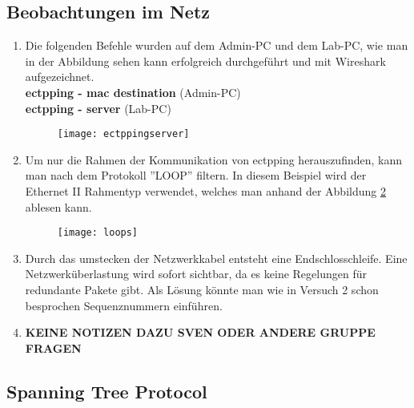 \documentclass{scrartcl}
\begin{document}
  \subsection[Aufgabe 4 Beobachtungen im Netz]{Beobachtungen im Netz}
  
  \renewcommand{\labelenumi}{\alph{enumi})}
  \begin{enumerate}
  \item
  Die folgenden Befehle wurden auf dem Admin-PC und dem Lab-PC, wie man in der Abbildung sehen kann erfolgreich durchgeführt und mit Wireshark aufgezeichnet.\\
  \textbf{ectpping - mac destination} (Admin-PC)\\
  \textbf{ectpping - server} (Lab-PC)
  
  \begin{figure}
    \texttt{[image: ectppingserver]}
    \label{fig:ectppingserver}
  \end{figure}
  
  \item
  Um nur die Rahmen der Kommunikation von ectpping herauszufinden, kann man nach dem Protokoll ''LOOP'' filtern. In diesem Beispiel wird der Ethernet II Rahmentyp verwendet, welches man anhand der Abbildung \ref{fig:loops} ablesen kann.
  
  \begin{figure}
    \texttt{[image: loops]}
    \label{fig:loops}
  \end{figure}
  
  \item
  Durch das umstecken der Netzwerkkabel entsteht eine Endschlosschleife. Eine Netzwerküberlastung wird sofort sichtbar, da es keine Regelungen für redundante Pakete gibt. Als Lösung könnte man wie in Versuch 2 schon besprochen Sequenznummern einführen.
  
  \item
 \textbf{KEINE NOTIZEN DAZU  SVEN ODER ANDERE GRUPPE FRAGEN}
 \end{enumerate}
 \subsection[Aufgabe 5 Spanning Tree Protocol]{Spanning Tree Protocol}
 
\end{document}
